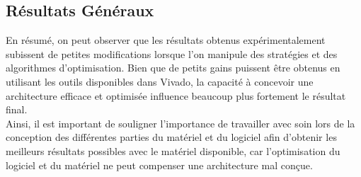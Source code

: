 \documentclass[../CSC_5RO07_TA.tex]{subfiles}
\begin{document}
\subsection{Résultats Généraux}
\noindent En résumé, on peut observer que les résultats obtenus expérimentalement subissent de petites modifications lorsque l'on manipule des stratégies et des algorithmes d'optimisation. Bien que de petits gains puissent être obtenus en utilisant les outils disponibles dans Vivado, la capacité à concevoir une architecture efficace et optimisée influence beaucoup plus fortement le résultat final.\\

\noindent Ainsi, il est important de souligner l'importance de travailler avec soin lors de la conception des différentes parties du matériel et du logiciel afin d'obtenir les meilleurs résultats possibles avec le matériel disponible, car l'optimisation du logiciel et du matériel ne peut compenser une architecture mal conçue.
\end{document}
